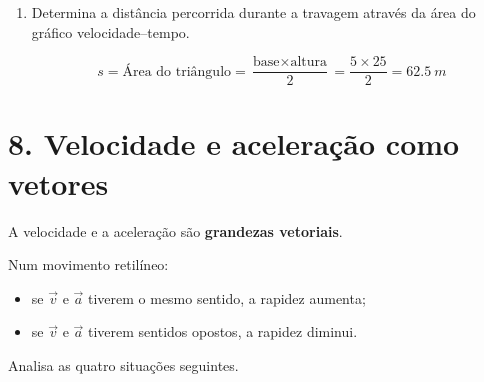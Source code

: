 \documentclass[11pt,a4paper]{article}
\begin{document}
\begin{enumerate}[label=\textbf{\arabic*.},resume]
		\item Determina a distância percorrida durante a travagem através da área do
		gráfico velocidade--tempo.
		
		\begin{solucao}
			\[
			s = \text{Área do triângulo} = \frac{\text{base} \times \text{altura}}{2} = \frac{5 \times 25}{2} = \SI{62.5}{m}
			\]
		\end{solucao}
		
	\end{enumerate}
	
	\section*{8. Velocidade e aceleração como vetores}
	
	\begin{recorda}
		
		A velocidade e a aceleração são \textbf{grandezas vetoriais}.
		
		Num movimento retilíneo:
		
		\begin{itemize}
			
			\item se $\vec{v}$ e $\vec{a}$ tiverem o mesmo sentido, a rapidez aumenta;
			
			\item se $\vec{v}$ e $\vec{a}$ tiverem sentidos opostos, a rapidez diminui.
			
		\end{itemize}
		
	\end{recorda}
	
	Analisa as quatro situações seguintes.
	
	
\end{document}
